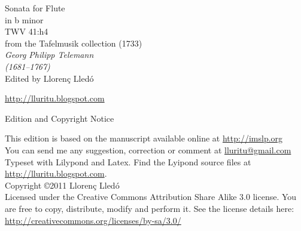 \documentclass[a4paper]{article}
\begin{document}
{
\centering
\vspace*{0.08\textheight}
\fontsize{40}{50}\selectfont Sonata for Flute\\[0.2\baselineskip] in b minor\\[0.5\baselineskip] 
\Huge TWV 41:h4\\[0.2\baselineskip] from the Tafelmusik collection (1733)\\[2\baselineskip]
{\huge \itshape Georg Philipp Telemann \\(1681–1767)\\[4.4\baselineskip]}
\Large Edited by Llorenç Lledó\par
\vspace{0.02\textheight}
\url{http://lluritu.blogspot.com}
\\[\baselineskip]
}

\newpage
\pagestyle{empty}

\begin{center}
\huge Edition and Copyright Notice
\end{center}
\vspace{0.09\textheight}
\large
This edition is based on the manuscript available online at \url{http://imslp.org} \\[0.3cm]
You can send me any suggestion, correction or comment at \href{mailto:lluritu@gmail.com}{lluritu@gmail.com} \\[1.3cm]

Typeset with Lilypond and Latex. Find the Lyipond source files at \url{http://lluritu.blogspot.com}.\\[1.3cm]

Copyright \copyright 2011 Llorenç Lledó\\[0.3cm]
Licensed under the Creative Commons Attribution Share Alike 3.0 license.
You are free to copy, distribute, modify and perform it.
See the license details here:\\
\url{http://creativecommons.org/licenses/by-sa/3.0/}\\[1.3cm]
\end{document}
